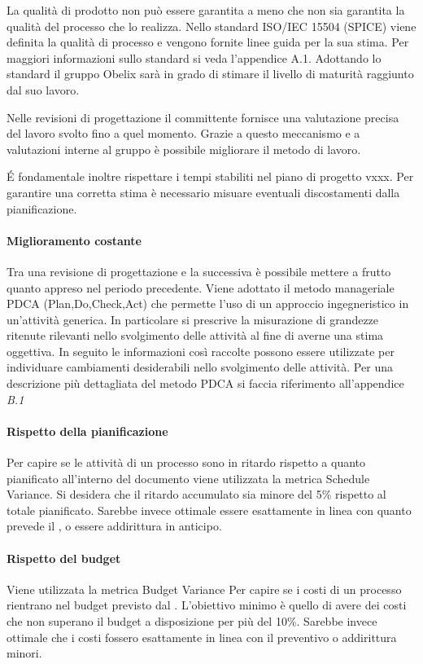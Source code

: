 La qualità di prodotto non può essere garantita a meno che non sia
garantita la qualità del processo che lo realizza. Nello standard
ISO/IEC 15504 (SPICE) viene definita la qualità di processo e vengono
fornite linee guida per la sua stima. Per maggiori informazioni sullo
standard si veda l'appendice A.1.
Adottando lo standard il gruppo Obelix sarà in grado di stimare
il livello di maturità raggiunto dal suo lavoro.

Nelle revisioni di progettazione il committente
fornisce una valutazione precisa del lavoro svolto fino a quel
momento.
Grazie a questo meccanismo e a valutazioni interne al gruppo è
possibile migliorare il metodo di lavoro.

\'E fondamentale inoltre rispettare i tempi stabiliti nel piano di
progetto vxxx. Per garantire una corretta stima è necessario misuare
eventuali discostamenti dalla pianificazione.

\paragraph{Miglioramento costante}

Tra una revisione di progettazione e la successiva è possibile
mettere a frutto quanto appreso nel periodo precedente.
Viene adottato il metodo manageriale PDCA (Plan,Do,Check,Act) che
permette l'uso di un approccio ingegneristico in un'attività generica.
In particolare si prescrive la misurazione di grandezze ritenute
rilevanti nello svolgimento delle attività al fine di averne una stima
oggettiva.
In seguito le informazioni così raccolte possono essere utilizzate per
individuare cambiamenti desiderabili nello svolgimento delle attività.
Per una descrizione più dettagliata del metodo PDCA si faccia
riferimento all'appendice \emph{B.1}


\paragraph{Rispetto della pianificazione}
Per capire se le attività di un processo sono in ritardo rispetto a
quanto pianificato all'interno del documento \emph{\pianodiprogetto} viene utilizzata la metrica Schedule Variance. Si desidera che
il ritardo accumulato sia minore del 5\% rispetto al totale
pianificato. Sarebbe invece ottimale essere esattamente in linea con
quanto prevede il \emph{\pianodiprogetto}, o essere addirittura
in anticipo.

\paragraph{Rispetto del budget}
Viene utilizzata la metrica Budget Variance Per capire se i costi di
un processo rientrano nel budget previsto dal \emph{\pianodiprogetto}.
L’obiettivo minimo è quello di avere dei costi che non superano il
budget a disposizione per più del 10\%. Sarebbe invece ottimale che i
costi fossero esattamente in linea con il preventivo o addirittura
minori.


